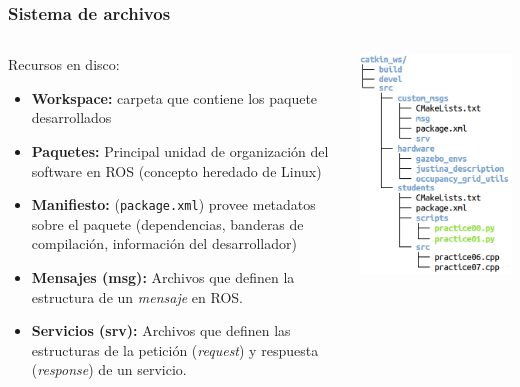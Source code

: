 \documentclass[10pt,spanish,aspectratio=1610]{beamer}
\begin{document}
\begin{frame}\frametitle{Sistema de archivos}
  \begin{columns}
    \begin{column}{0.5\textwidth}
      Recursos en disco:
      \begin{itemize}
      \item \textbf{Workspace:} carpeta que contiene los paquete desarrollados
      \item \textbf{Paquetes:} Principal unidad de organización del software en ROS (concepto heredado de Linux)
      \item \textbf{Manifiesto:} (\texttt{package.xml}) provee metadatos sobre el paquete (dependencias, banderas de compilación, información del desarrollador)
      \item \textbf{Mensajes (msg):} Archivos que definen la estructura de un \textit{mensaje} en ROS.
        \item \textbf{Servicios (srv):} Archivos que definen las estructuras de la petición (\textit{request}) y respuesta (\textit{response}) de un servicio. 
      \end{itemize}
    \end{column}
    \begin{column}{0.4\textwidth}
      \includegraphics[width=\textwidth]{Figures/catkin_tree.png}
    \end{column}
  \end{columns}
\end{frame}
\end{document}
